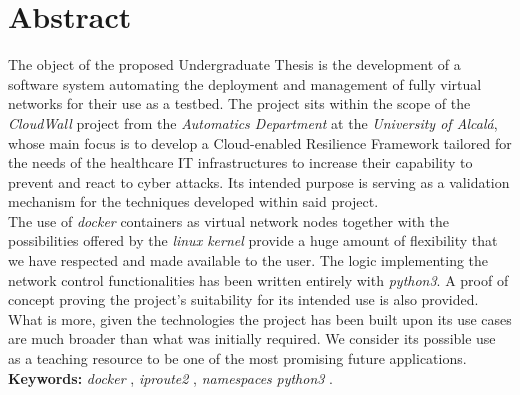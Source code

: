 \chapter{Abstract}
    \thispagestyle{empty}

    The object of the proposed Undergraduate Thesis is the development of a software system automating the deployment and management of fully virtual networks for their use as a testbed. The project sits within the scope of the \textit{CloudWall} \cite{bib:react} project from the \textit{Automatics Department} at the \textit{University of Alcalá}, whose main focus is to develop a Cloud-enabled Resilience Framework tailored for the needs of the healthcare IT infrastructures to increase their capability to prevent and react to cyber attacks. Its intended purpose is serving as a validation mechanism for the techniques developed within said project.\\

    The use of \textit{docker} containers as virtual network nodes together with the possibilities offered by the \textit{linux kernel} provide a huge amount of flexibility that we have respected and made available to the user. The logic implementing the network control functionalities has been written entirely with \textit{python3}. A proof of concept proving the project's suitability for its intended use is also provided. What is more, given the technologies the project has been built upon its use cases are much broader than what was initially required. We consider its possible use as a teaching resource to be one of the most promising future applications.\\

    \textbf{Keywords:} \textit{docker} \cite{bib:docker}, \textit{iproute2} \cite{bib:man-ip}, \textit{namespaces} \cite{bib:man-namespaces} \textit{python3} \cite{bib:python}.
